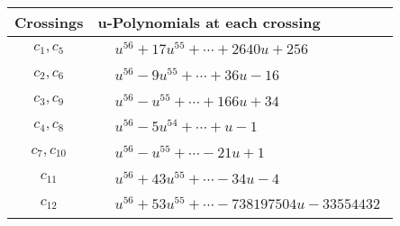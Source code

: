 \documentclass[1p]{elsarticle_modified}
\theoremstyle{definition}
\begin{document}
\begin{tabular}{m{50pt}|m{274pt}}
Crossings & \hspace{64pt}u-Polynomials at each crossing \\
\hline $$\begin{aligned}c_{1},c_{5}\end{aligned}$$&$\begin{aligned}
&u^{56}+17 u^{55}+\cdots+2640 u+256
\end{aligned}$\\
\hline $$\begin{aligned}c_{2},c_{6}\end{aligned}$$&$\begin{aligned}
&u^{56}-9 u^{55}+\cdots+36 u-16
\end{aligned}$\\
\hline $$\begin{aligned}c_{3},c_{9}\end{aligned}$$&$\begin{aligned}
&u^{56}- u^{55}+\cdots+166 u+34
\end{aligned}$\\
\hline $$\begin{aligned}c_{4},c_{8}\end{aligned}$$&$\begin{aligned}
&u^{56}-5 u^{54}+\cdots+u-1
\end{aligned}$\\
\hline $$\begin{aligned}c_{7},c_{10}\end{aligned}$$&$\begin{aligned}
&u^{56}- u^{55}+\cdots-21 u+1
\end{aligned}$\\
\hline $$\begin{aligned}c_{11}\end{aligned}$$&$\begin{aligned}
&u^{56}+43 u^{55}+\cdots-34 u-4
\end{aligned}$\\
\hline $$\begin{aligned}c_{12}\end{aligned}$$&$\begin{aligned}
&u^{56}+53 u^{55}+\cdots-738197504 u-33554432
\end{aligned}$\\
\hline
\end{tabular}\\~\\
\newpage\renewcommand{\arraystretch}{1}
\end{document}
